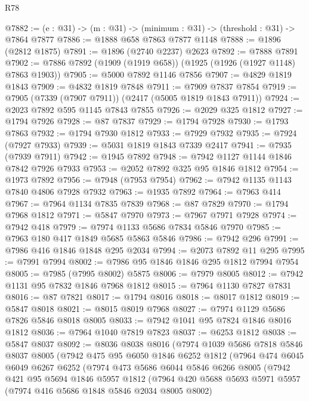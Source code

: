 \begin{lexlean}{R78}
\begin{coremodule}
@7882 := (e : @31) -> (m : @31) -> (minimum : @31) -> (threshold : @31) -> @7864 @7877
@7886 := @1888 @658 @7863 @7877 @1148
@7888 := @1896 (@2812 @1875)
@7891 := @1896 (@2740 @2237) @2623
@7892 := @7888 @7891
@7902 := @7886 @7892 (@1909 (@1919 @658)) (@1925 (@1926 (@1927 @1148) @7863 @1903))
@7905 := @5000 @7892 @1146 @7856
@7907 := @4829 @1819 @1843
@7909 := @4832 @1819 @7848
@7911 := @7909 @7837 @7854
@7919 := @7905 (@7339 (@7907 @7911)) (@2417 (@5005 @1819 @1843 @7911))
@7924 := @2023 @7892 @595 @1145 @7843 @7855
@7926 := @2029 @325 @1812
@7927 := @1794 @7926
@7928 := @87 @7837
@7929 := @1794 @7928
@7930 := @1793 @7863
@7932 := @1794 @7930 @1812
@7933 := @7929 @7932
@7935 := @7924 (@7927 @7933)
@7939 := @5031 @1819 @1843 @7339 @2417
@7941 := @7935 (@7939 @7911)
@7942 := @1945 @7892
@7948 := @7942 @1127 @1144 @1846 @7842 @7926 @7933
@7953 := @2052 @7892 @325 @95 @1846 @1812
@7954 := @1973 @7892
@7956 := @7948 (@7953 @7954)
@7962 := @7942 @1135 @1143 @7840 @4806 @7928 @7932
@7963 := @1935 @7892
@7964 := @7963 @414
@7967 := @7964 @1134 @7835 @7839
@7968 := @87 @7829
@7970 := @1794 @7968 @1812
@7971 := @5847 @7970
@7973 := @7967 @7971 @7928
@7974 := @7942 @418
@7979 := @7974 @1133 @5686 @7834 @5846 @7970
@7985 := @7963 @180 @417 @1849 @5685 @5863 @5846
@7986 := @7942 @296
@7991 := @7986 @416 @1846 @1848 @295 @2034
@7994 := @2073 @7892 @11 @295
@7995 := @7991 @7994
@8002 := @7986 @95 @1846 @1846 @295 @1812 @7994 @7954
@8005 := @7985 (@7995 @8002) @5875
@8006 := @7979 @8005
@8012 := @7942 @1131 @95 @7832 @1846 @7968 @1812
@8015 := @7964 @1130 @7827 @7831
@8016 := @87 @7821
@8017 := @1794 @8016
@8018 := @8017 @1812
@8019 := @5847 @8018
@8021 := @8015 @8019 @7968
@8027 := @7974 @1129 @5686 @7826 @5846 @8018 @8005
@8033 := @7942 @1041 @95 @7824 @1846 @8016 @1812
@8036 := @7964 @1040 @7819 @7823
@8037 := @6253 @1812
@8038 := @5847 @8037
@8092 := @8036
    @8038
    @8016
    (@7974
      @1039
      @5686
      @7818
      @5846
      @8037
      @8005
      (@7942
        @475
        @95
        @6050
        @1846
        @6252
        @1812
        (@7964
          @474
          @6045
          @6049
          @6267
          @6252
          (@7974
            @473
            @5686
            @6044
            @5846
            @6266
            @8005
            (@7942
              @421
              @95
              @5694
              @1846
              @5957
              @1812
              (@7964
                @420
                @5688
                @5693
                @5971
                @5957
                (@7974 @416 @5686 @1848 @5846 @2034 @8005 @8002)

\end{coremodule}
\end{lexlean}
